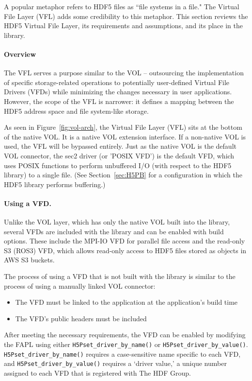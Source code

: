 A popular metaphor refers to HDF5 files as ``file systems in a file." The Virtual File Layer (VFL) adds some credibility to this metaphor. This section reviews the HDF5 Virtual File Layer, its requirements and assumptions, and its place in the library.

\paragraph{Overview} The VFL serves a purpose similar to the VOL -- outsourcing the implementation of specific storage-related operations to potentially user-defined Virtual File Drivers (VFDs) while minimizing the changes necessary in user applications. However, the scope of the VFL is narrower: it defines a mapping between the HDF5 address space and file system-like storage. 

As seen in Figure~\ref{fig:vol-arch}, the Virtual File Layer (VFL) sits at the bottom of the native VOL. It is a native VOL extension interface. If a non-native VOL is used, the VFL will be bypassed entirely. Just as the native VOL is the default VOL connector, the sec2 driver (or 'POSIX VFD') is the default VFD, which uses POSIX functions to perform unbuffered I/O (with respect to the HDF5 library) to a single file. (See Section~\ref{sec:H5PB} for a configuration in which the HDF5 library performs buffering.)

\paragraph{Using a VFD.} Unlike the VOL layer, which has only the native VOL built into the library, several VFDs are included with the library and can be enabled with build options. These include the MPI-IO VFD for parallel file access and the read-only S3 (ROS3) VFD, which allows read-only access to HDF5 files stored as objects in AWS S3 buckets.

The process of using a VFD that is not built with the library is similar to the process of using a manually linked VOL connector:
\begin{itemize}
    \item The VFD must be linked to the application at the application's build time
    \item The VFD's public headers must be included 
\end{itemize}

After meeting the necessary requirements, the VFD can be enabled by modifying the FAPL using either \texttt{H5Pset\_driver\_by\_name()} or \texttt{H5Pset\_driver\_by\_value()}. \texttt{H5Pset\_driver\_by\_name()} requires a case-sensitive name specific to each VFD, and \texttt{H5Pset\_driver\_by\_value()} requires a `driver value,' a unique number assigned to each VFD that is registered with The HDF Group.

